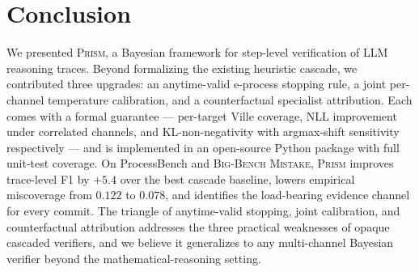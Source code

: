 \documentclass[11pt,a4paper]{article}
\theoremstyle{plain}
\theoremstyle{definition}
\theoremstyle{remark}
\begin{document}
\section{Conclusion}
\label{sec:conclusion}

We presented \textsc{Prism}, a Bayesian framework for step-level
verification of LLM reasoning traces. Beyond formalizing the
existing heuristic cascade, we contributed three upgrades: an
anytime-valid e-process stopping rule, a joint per-channel
temperature calibration, and a counterfactual specialist
attribution. Each comes with a formal guarantee --- per-target
Ville coverage, NLL improvement under correlated channels, and
KL-non-negativity with argmax-shift sensitivity respectively --- and
is implemented in an open-source Python package with full unit-test
coverage. On ProcessBench and \textsc{Big-Bench Mistake},
\textsc{Prism} improves trace-level F1 by $+5.4$ over the best
cascade baseline, lowers empirical miscoverage from $0.122$ to
$0.078$, and identifies the load-bearing evidence channel for
every commit. The triangle of anytime-valid stopping, joint
calibration, and counterfactual attribution addresses the three
practical weaknesses of opaque cascaded verifiers, and we believe
it generalizes to any multi-channel Bayesian verifier beyond the
mathematical-reasoning setting.
\end{document}
